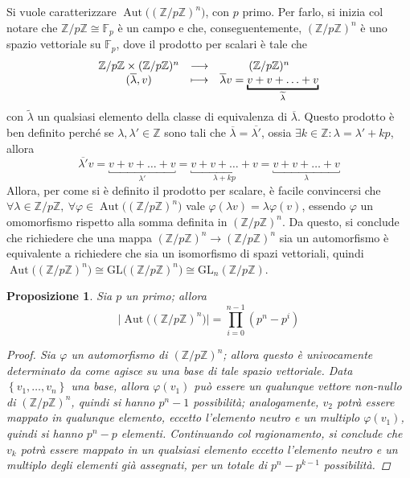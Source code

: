 \documentclass[12pt]{scrartcl}
\theoremstyle{style}
\newtheorem{prop}{Proposizione}[section]
\numberwithin{equation}{subsection}
\begin{document}
Si vuole caratterizzare $\operatorname{Aut} \big((\mathbb{Z}/p\mathbb{Z})^n\big)$, con $p$ primo.
Per farlo, si inizia col notare che $\mathbb{Z}/p\mathbb{Z} \cong \mathbb{F}_p$ \`e un campo e che, conseguentemente, $(\mathbb{Z}/p\mathbb{Z})^n$ \`e uno spazio vettoriale su $\mathbb{F}_p$, dove il prodotto per scalari \`e tale che
\[
\begin{array}
	{c c c} 
	\mathbb{Z}/p\mathbb{Z}\times (\mathbb{Z}/p\mathbb{Z})^n &\longrightarrow & (\mathbb{Z}/p\mathbb{Z})^n\\
	(\overline{\lambda },v) &\longmapsto & \overline{\lambda }v = \underbracket{v + v+ \ldots+v}_{\widetilde{\lambda }} 
\end{array}
\] 
con $\widetilde{\lambda }$ un qualsiasi elemento della classe di equivalenza di $\overline{\lambda }$.
Questo prodotto \`e ben definito perch\'e se $\lambda , \lambda ' \in \mathbb{Z}$ sono tali che $\overline{\lambda } = \overline{\lambda '}$, ossia $\exists k \in \mathbb{Z} : \lambda  = \lambda ' + kp$, allora
\[
\overline{\lambda '} v = \underbracket{v + v+ \ldots+v}_{\lambda '}= \underbracket{v + v+ \ldots+v}_{\lambda +kp} = \underbracket{v + v+ \ldots+v}_{\lambda}
\] 
Allora, per come si \`e definito il prodotto per scalare, \`e facile convincersi che $\forall \lambda \in \mathbb{Z}/p\mathbb{Z},\ \forall \varphi \in \operatorname{Aut} \big((\mathbb{Z}/p\mathbb{Z})^n\big)$ vale $\varphi (\lambda v) = \lambda \varphi (v)$, essendo $\varphi $ un omomorfismo rispetto alla somma definita in $(\mathbb{Z}/p\mathbb{Z})^n$. 
Da questo, si conclude che richiedere che una mappa $(\mathbb{Z}/p\mathbb{Z})^n \to (\mathbb{Z}/p\mathbb{Z})^n$ sia un automorfismo \`e equivalente a richiedere che sia un isomorfismo di spazi vettoriali, quindi $\operatorname{Aut} \big((\mathbb{Z}/p\mathbb{Z})^n\big) \cong \mathrm{GL} \big((\mathbb{Z}/p\mathbb{Z})^n\big)\cong \mathrm{GL} _n (\mathbb{Z}/p\mathbb{Z})$.
\begin{prop}
	Sia $p$ un primo; allora
	\[
	\big\lvert \operatorname{Aut} \big((\mathbb{Z}/p\mathbb{Z})^n\big) \big\rvert = \prod_{i=0} ^{n-1} (p^n- p^i)
	\] 
	\begin{proof}
		Sia $\varphi $ un automorfismo di $(\mathbb{Z}/p\mathbb{Z})^n$; allora questo \`e univocamente determinato da come agisce su una base di tale spazio vettoriale. 
		Data $\left\{ v_1,\ldots,v_n \right\} $ una base, allora $\varphi (v_1)$ pu\`o essere un qualunque vettore non-nullo di $(\mathbb{Z}/p\mathbb{Z})^n$, quindi si hanno $p^n-1$ possibilit\`a; analogamente, $v_2$ potr\`a essere mappato in qualunque elemento, eccetto l'elemento neutro e un multiplo $\varphi (v_1)$, quindi si hanno $p^n-p $ elementi. 
		Continuando col ragionamento, si conclude che $v_k$ potr\`a essere mappato in un qualsiasi elemento eccetto l'elemento neutro e un multiplo degli elementi gi\`a assegnati, per un totale di $p^n - p^{k-1} $ possibilit\`a.
	\end{proof}
\end{prop}
\end{document}
